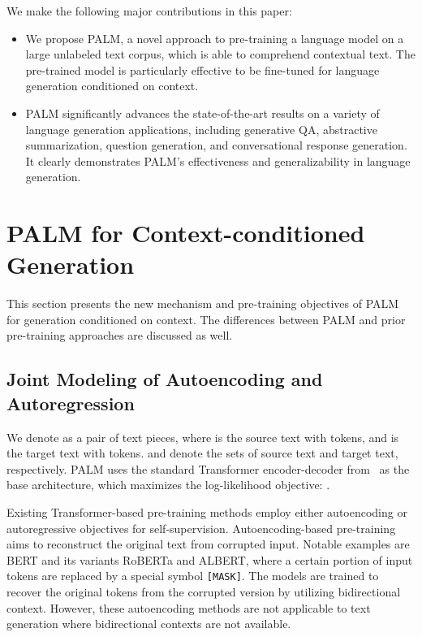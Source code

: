 \documentclass[11pt,a4paper]{article}
\newcommand{\method}{PALM\xspace}
\begin{document}
We make the following major contributions in this paper:
\begin{itemize}
    \item We propose \method, a novel approach to pre-training a language model on a large unlabeled text corpus, which is able to comprehend contextual text. The pre-trained model is particularly effective to be fine-tuned for language generation conditioned on context.
    \item \method significantly advances the state-of-the-art results on a variety of language generation applications, including generative QA, abstractive summarization, question generation, and conversational response generation. It clearly demonstrates \method's effectiveness and generalizability in language generation.
\end{itemize}

\section{\method for Context-conditioned Generation}
This section presents the new mechanism and pre-training objectives of \method for generation conditioned on context. The differences between \method and prior pre-training approaches are discussed as well.

\subsection{Joint Modeling of Autoencoding and Autoregression}
We denote  as a pair of text pieces, where  is the source text with  tokens, and  is the target text with  tokens.  and  denote the sets of source text and target text, respectively. \method uses the standard Transformer encoder-decoder from~\cite{Vaswani17attention} as the base architecture, which maximizes the log-likelihood objective: .

Existing Transformer-based pre-training methods employ either autoencoding or autoregressive objectives for self-supervision. Autoencoding-based pre-training aims to reconstruct the original text from corrupted input. Notable examples are BERT and its variants RoBERTa and ALBERT, where a certain portion of input tokens are replaced by a special symbol \texttt{[MASK]}. The models are trained to recover the original tokens from the corrupted version by utilizing bidirectional context. However, these autoencoding methods are not applicable to text generation where bidirectional contexts are not available.
\end{document}
